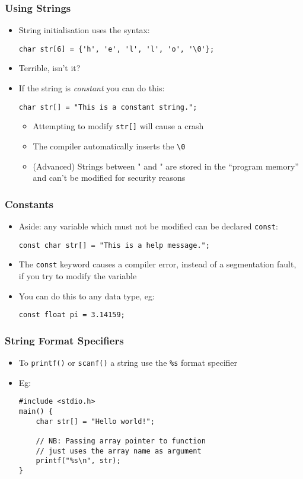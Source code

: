\documentclass[14pt]{beamer}
\begin{document}
\begin{frame}[fragile]
\frametitle{Using Strings}
\begin{itemize}
\item String initialisation uses the syntax:
\begin{lstlisting}[style=CStyle]
char str[6] = {'h', 'e', 'l', 'l', 'o', '\0'};
\end{lstlisting}
\pause
\item Terrible, isn't it?
\pause
\item If the string is \textit{constant} you can do this:
\begin{lstlisting}[style=CStyle]
char str[] = "This is a constant string.";
\end{lstlisting}
	\begin{itemize}
		\item Attempting to modify \texttt{str[]} will cause a crash
		\item The compiler automatically inserts the \texttt{\textbackslash 0}
		\item (Advanced) Strings between " and " are stored in the ``program memory'' and can't be modified for security reasons
	\end{itemize}
\end{itemize}
\end{frame}

\begin{frame}[fragile]
\frametitle{Constants}
\begin{itemize}
\item Aside: any variable which must not be modified can be declared \texttt{const}:
\begin{lstlisting}[style=CStyle]
const char str[] = "This is a help message.";
\end{lstlisting}
\item The \texttt{const} keyword causes a compiler error, instead of a segmentation fault, if you try to modify the variable
\item You can do this to any data type, eg:
\begin{lstlisting}[style=CStyle]
const float pi = 3.14159;
\end{lstlisting}
\end{itemize}
\end{frame}

\begin{frame}[fragile]
\frametitle{String Format Specifiers}
\begin{itemize}
\item To \texttt{printf()} or \texttt{scanf()} a string use the \texttt{\%s} format specifier
\item Eg:
\begin{lstlisting}[style=CStyle]
#include <stdio.h>
main() {
	char str[] = "Hello world!";
	
	// NB: Passing array pointer to function
	// just uses the array name as argument
	printf("%s\n", str);
}
\end{lstlisting}
\end{itemize}
\end{frame}
\end{document}
